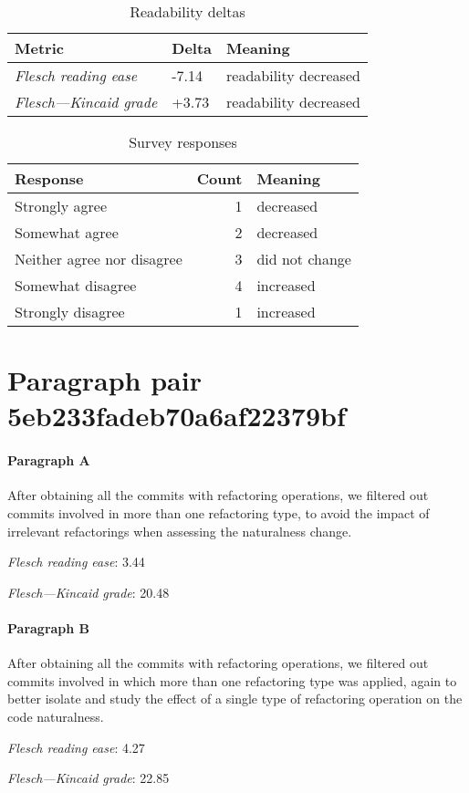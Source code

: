 \bigskip\begin{table}[!h]
\centering
\begin{tabular}{lll}
\toprule
               \textbf{Metric} & \textbf{Delta} &       \textbf{Meaning} \\
\midrule
    \emph{Flesch reading ease} &          -7.14 &  readability decreased \\
 \emph{Flesch---Kincaid grade} &          +3.73 &  readability decreased \\
\bottomrule
\end{tabular}
\caption*{Readability deltas}\end{table}

\begin{table}[!h]
\centering
\begin{tabular}{lrl}
\toprule
          \textbf{Response} &  \textbf{Count} & \textbf{Meaning} \\
\midrule
             Strongly agree &               1 &        decreased \\
             Somewhat agree &               2 &        decreased \\
 Neither agree nor disagree &               3 &   did not change \\
          Somewhat disagree &               4 &        increased \\
          Strongly disagree &               1 &        increased \\
\bottomrule
\end{tabular}
\caption*{Survey responses}\end{table}


\newpage
\section{Paragraph pair 5eb233fadeb70a6af22379bf}
\paragraph{Paragraph A}
After obtaining all the commits with refactoring operations, we filtered out commits involved in more than one refactoring type, to avoid the impact of irrelevant refactorings when assessing the naturalness change.\par\medskip
\emph{Flesch reading ease}: 3.44\par
\emph{Flesch---Kincaid grade}: 20.48

\paragraph{Paragraph B}
After obtaining all the commits with refactoring operations, we filtered out commits involved in which more than one refactoring type was applied, again to better isolate and study the effect of a single type of refactoring operation on the code naturalness.\par\medskip
\emph{Flesch reading ease}: 4.27\par
\emph{Flesch---Kincaid grade}: 22.85

